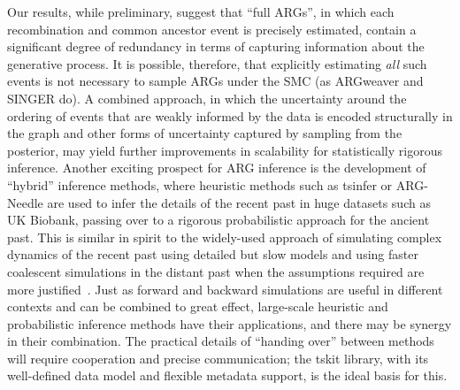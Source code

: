 \documentclass{article}
\begin{document}
Our results, while preliminary, suggest that ``full ARGs'', in which
each recombination and common ancestor event is precisely estimated,
contain a significant degree of redundancy in terms of capturing
information about the generative process.
It is possible, therefore, that explicitly estimating
\emph{all} such events is not necessary to sample ARGs under the
SMC (as ARGweaver and SINGER do).
A combined approach, in which the uncertainty around the
ordering of events that are
weakly informed by the data is encoded structurally in the
graph and other forms of uncertainty captured by sampling from
the posterior, may yield further improvements in
scalability for statistically rigorous inference.
Another exciting prospect for ARG inference is the development of
``hybrid'' inference methods, where heuristic methods such as
tsinfer or ARG-Needle are used to infer
the details of the recent past in huge datasets such as
UK Biobank, passing over to a rigorous probabilistic approach 
for the ancient past.
This is similar in spirit to the widely-used approach
of simulating complex dynamics of the recent past using
detailed but slow models and using faster coalescent simulations
in the distant past when the assumptions required
are more justified~\citep{bhaskar_distortion_2014,
kelleher_efficient_2018,haller_tree_2018,nelson_accounting_2020}.
Just as forward and backward simulations are useful in different contexts
and can be combined to great effect,
large-scale heuristic and probabilistic inference  
methods have their applications, and there may be synergy in their combination.
The practical details of ``handing over'' between methods
will require cooperation and precise communication;
the tskit library, with its well-defined data model and flexible
metadata support, is the ideal basis for this.
\end{document}

